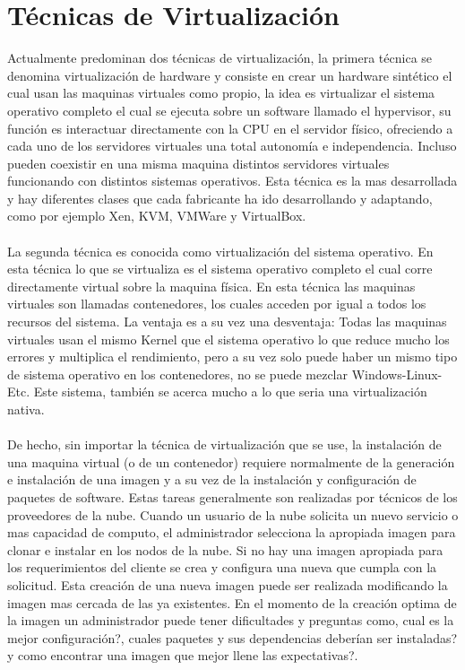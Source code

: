 \section{Técnicas de Virtualización}
Actualmente predominan dos técnicas de virtualización, la primera técnica se denomina virtualización de hardware y consiste en crear un hardware sintético el cual usan las maquinas virtuales como propio, la idea es virtualizar el sistema operativo completo el cual se ejecuta sobre un software llamado el hypervisor, su función es interactuar directamente con la CPU en el servidor físico, ofreciendo a cada uno de los servidores virtuales una total autonomía e independencia. Incluso pueden coexistir en una misma maquina distintos servidores virtuales funcionando con distintos sistemas operativos. Esta técnica es la mas desarrollada y hay diferentes clases que cada fabricante ha ido desarrollando y adaptando, como por ejemplo Xen, KVM, VMWare y VirtualBox.\\
\\
La segunda técnica es conocida como virtualización del sistema operativo. En esta técnica lo que se virtualiza es el sistema operativo completo el cual corre directamente virtual sobre la maquina física. En esta técnica las maquinas virtuales son llamadas contenedores, los cuales acceden por igual a todos los recursos del sistema. La ventaja es a su vez una desventaja: Todas las maquinas virtuales usan el mismo Kernel que el sistema operativo lo que reduce mucho los errores y multiplica el rendimiento, pero a su vez solo puede haber un mismo tipo de sistema operativo en los contenedores, no se puede mezclar Windows-Linux-Etc. Este sistema, también se acerca mucho a lo que seria una virtualización nativa.\\
\\
De hecho, sin importar la técnica de virtualización que se use, la instalación de una maquina virtual (o de un contenedor) requiere normalmente de la generación e instalación de una imagen y a su vez de la instalación y configuración de paquetes de software. Estas tareas generalmente son realizadas por técnicos de los proveedores de la nube. Cuando un usuario de la nube solicita un nuevo servicio o mas capacidad de computo, el administrador selecciona la apropiada imagen para clonar e instalar en los nodos de la nube. Si no hay una imagen apropiada para los requerimientos del cliente se crea y configura una nueva que cumpla con la solicitud. Esta creación de una nueva imagen puede ser realizada modificando la imagen mas cercada de las ya existentes. En el momento de la creación optima de la imagen un administrador puede tener dificultades y preguntas como, cual es la mejor configuración?, cuales paquetes y sus dependencias deberían ser instaladas? y como encontrar una imagen que mejor llene las expectativas?.\\
